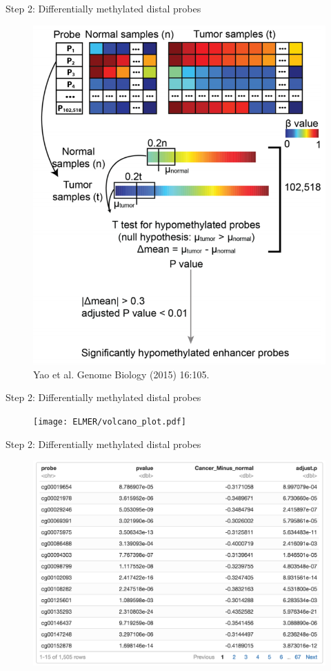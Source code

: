 \documentclass[slidestop,compress,11pt,xcolor=dvipsnames]{beamer}
\begin{document}
\begin{frame}{Step 2: Differentially methylated distal probes}
 \vspace*{-0.3cm}
 \begin{figure}
  \centering
  \includegraphics[width=0.5\linewidth]{diffmeth.png}{\tiny{\\Yao et al. Genome Biology (2015) 16:105.}}
 \end{figure}
\end{frame}

\begin{frame}{Step 2: Differentially methylated distal probes}
 \begin{figure}
  \centering
  \texttt{[image: ELMER/volcano\_plot.pdf]}
 \end{figure}
\end{frame}

\begin{frame}{Step 2: Differentially methylated distal probes}
 \begin{figure}
  \centering
  \includegraphics[width=0.9\linewidth]{ELMER/metdiff_tbl.png}
 \end{figure}
\end{frame}
\end{document}
